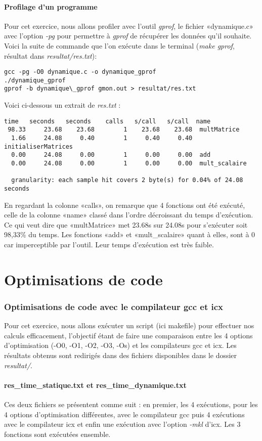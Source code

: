 \documentclass{rapport}
\begin{document}
\subsection{Profilage d'un programme}
Pour cet exercice, nous allons profiler avec l'outil \textit{gprof}, le fichier «dynamique.c» avec l'option \textit{-pg} pour permettre à \textit{gprof} de récupérer les données qu'il souhaite. Voici la suite de commande que l'on exécute dans le terminal (\textit{make gprof}, résultat dans \textit{resultat/res.txt}): 
 \begin{lstlisting}
gcc -pg -O0 dynamique.c -o dynamique_gprof
./dynamique_gprof
gprof -b dynamique\_gprof gmon.out > resultat/res.txt
  \end{lstlisting} 
  Voici ci-dessous un extrait de \textit{res.txt} :
  \begin{lstlisting}
time   seconds   seconds    calls   s/call   s/call  name    
 98.33     23.68    23.68        1    23.68    23.68  multMatrice
  1.66     24.08     0.40        1     0.40     0.40  initialiserMatrices
  0.00     24.08     0.00        1     0.00     0.00  add
  0.00     24.08     0.00        1     0.00     0.00  mult_scalaire

  granularity: each sample hit covers 2 byte(s) for 0.04% of 24.08 seconds
  \end{lstlisting} 
En regardant la colonne «calls», on remarque que 4 fonctions ont été exécuté, celle de la colonne «name» classé dans l'ordre décroissant du temps d'exécution. Ce qui veut dire que «multMatrice» met 23.68s sur 24.08s pour s'exécuter soit 98,33\% du temps.
Les fonctions «add» et «mult\_scalaire» quant à elles, sont à 0 car imperceptible par l'outil. Leur temps d'exécution est très faible.
\clearpage
    \part{Optimisations de code}
    \section{Optimisations de code avec le compilateur gcc et icx}
Pour cet exercice, nous allons exécuter un script (ici makefile) pour effectuer nos calculs efficacement, l'objectif étant de faire une comparaison entre les 4 options d'optimisation (-O0, -O1, -O2, -O3, -Os) et les compilateurs gcc et icx. Les résultats obtenus sont redirigés dans des fichiers disponibles dans le dossier \textit{resultat/}.
\subsection{res\_time\_statique.txt et res\_time\_dynamique.txt}
\label{sec:mkl}
Ces deux fichiers se présentent comme suit : en premier, les 4 exécutions, pour les 4 options d'optimisation différentes, avec le compilateur gcc puis 4 exécutions avec le compilateur icx et enfin une exécution avec l'option \textit{-mkl} d'icx. Les 3 fonctions sont exécutées ensemble.
\end{document}
